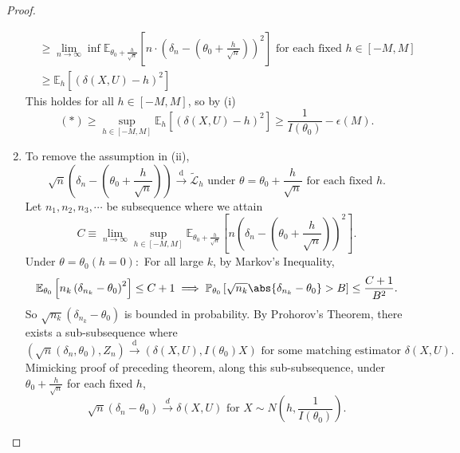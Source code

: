 \documentclass[a4paper]{article}
\begin{document}
\begin{proof}
\begin{enumerate}[leftmargin=*]
\begin{equation*}
\begin{aligned}
				& \geq \lim\limits_{n \to \infty} \inf \mathbb{E}_{\theta_0+\frac{h}{\sqrt{n}}} \left[n \cdot \left(\delta_n - \left(\theta_0 + \frac{h}{\sqrt{n}}\right)\right)^2\right] \text{ for each fixed $h \in [-M,M]$} \\
				& \geq \mathbb{E}_h \left[(\delta(X,U) - h)^2\right]
			\end{aligned}
		\end{equation*}
		This holdes for all $h \in [-M,M]$, so by (i)
		\begin{equation*}
			(\ast) \geq \sup\limits_{h \in [-M,M]} \mathbb{E}_h \left[(\delta(X,U) - h)^2\right] \geq \frac{1}{I(\theta_0)} - \epsilon(M).
		\end{equation*}
		\item To remove the assumption in (ii),
		\begin{equation*}
			\sqrt{n} \left(\delta_n - \left(\theta_0 + \frac{h}{\sqrt{n}}\right)\right) \stackrel{\text{d}}{\longrightarrow} \tilde{\mathcal{L}}_h \text{ under $\theta = \theta_0 + \frac{h}{\sqrt{n}}$ for each fixed $h$.}
		\end{equation*}
		Let $n_1,n_2,n_3,\cdots$ be subsequence where we attain
		\begin{equation*}
			C \equiv \lim\limits_{n \to \infty} \sup\limits_{h \in [-M,M]} \mathbb{E}_{\theta_0 + \frac{h}{\sqrt{n}}} \left[n \left(\delta_n - \left(\theta_0 + \frac{h}{\sqrt{n}}\right)\right)^2\right].
		\end{equation*}
		Under $\theta = \theta_0 (h = 0):$ For all large $k$, by Markov's Inequality, 
		\begin{equation*}
			\mathbb{E}_{\theta_0} \left[n_k \left(\delta_{n_k} - \theta_0\right)^2\right] \leq C + 1 \implies \mathbb{P}_{\theta_0} \left[\sqrt{n_k} \abs{\delta_{n_k} - \theta_0} > B\right] \leq \frac{C+1}{B^2}.
		\end{equation*}
		So $\sqrt{n_k}(\delta_{n_k} - \theta_0)$ is bounded in probability. By Prohorov's Theorem, there exists a sub-subsequence where
		\begin{equation*}
			\left(\sqrt{n}(\delta_n,\theta_0), Z_n\right) \stackrel{\text{d}}{\longrightarrow} (\delta(X,U),I(\theta_0)X) \text{ for some matching estimator $\delta(X,U)$}.
		\end{equation*}
		Mimicking proof of preceding theorem, along this sub-subsequence, under $\theta_0 + \frac{h}{\sqrt{n}}$ for each fixed $h$,
		\begin{equation*}
			\sqrt{n} \left(\delta_n - \theta_0\right) \stackrel{d}{\longrightarrow} \delta(X,U) \text{ for }  X \sim N\left(h, \frac{1}{I(\theta_0)}\right).

\end{equation*}
\end{enumerate}
\end{proof}
\end{document}
